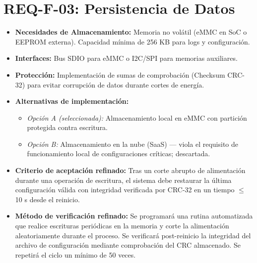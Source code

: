 \documentclass[%
	paper=a4,
	twoside=false,
	parskip=half,
	chapterprefix=false,
	10pt,
	headings=normal,
	bibliography=totoc,
	listof=totoc,
	titlepage=on,
	captions=tableabove,
	draft=false,
]{scrbook}%
\begin{document}
\section{REQ-F-03: Persistencia de Datos}
\begin{itemize}
    \item \textbf{Necesidades de Almacenamiento:} Memoria no volátil (eMMC en SoC o EEPROM externa). Capacidad mínima de 256 KB para logs y configuración.
    \item \textbf{Interfaces:} Bus SDIO para eMMC o I2C/SPI para memorias auxiliares.
    \item \textbf{Protección:} Implementación de sumas de comprobación (Checksum CRC-32) para evitar corrupción de datos durante cortes de energía.
    \item \textbf{Alternativas de implementación:}
        \begin{itemize}
            \item \textit{Opción A (seleccionada):} Almacenamiento local en eMMC con partición protegida contra escritura.
            \item \textit{Opción B:} Almacenamiento en la nube (SaaS) — viola el requisito de funcionamiento local de configuraciones críticas; descartada.
        \end{itemize}
    \item \textbf{Criterio de aceptación refinado:} Tras un corte abrupto de alimentación durante una operación de escritura, el sistema debe restaurar la última configuración válida con integridad verificada por CRC-32 en un tiempo $\leq$ 10 s desde el reinicio.
    \item \textbf{Método de verificación refinado:} Se programará una rutina automatizada que realice escrituras periódicas en la memoria y corte la alimentación aleatoriamente durante el proceso. Se verificará post-reinicio la integridad del archivo de configuración mediante comprobación del CRC almacenado. Se repetirá el ciclo un mínimo de 50 veces.
\end{itemize}

\end{document}
